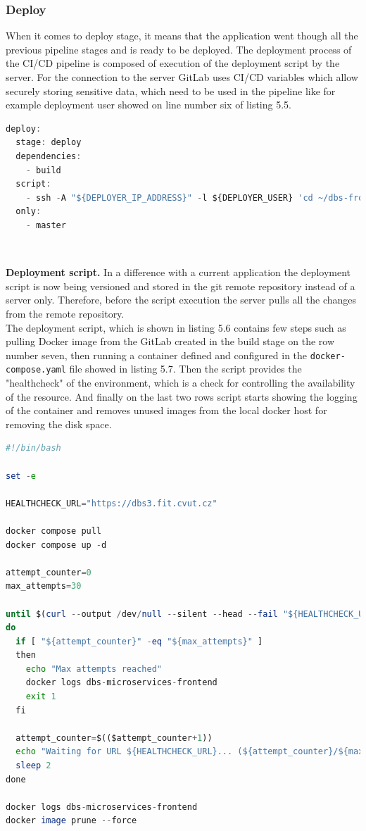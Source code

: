 \subsubsection{Deploy} When it comes to deploy stage, it means that the application went though all the previous pipeline stages and is ready to be deployed. The deployment process of the CI/CD pipeline is composed of execution of the deployment script by the server. For the connection to the server GitLab uses CI/CD variables which allow securely storing sensitive data, which need to be used in the pipeline like for example deployment user showed on line number six of listing 5.5.


\begin{lstlisting}[language=Octave, caption=Deploy stage in the CI/CD pipeline]
deploy:
  stage: deploy
  dependencies:
    - build
  script:
    - ssh -A "${DEPLOYER_IP_ADDRESS}" -l ${DEPLOYER_USER} 'cd ~/dbs-frontend && git pull && cd ./.docker/server && bash deploy-dbs-frontend.sh'
  only:
    - master
\end{lstlisting}

\

\noindent \textbf{Deployment script.} In a difference with a current application the deployment script is now being versioned and stored in the git remote repository instead of a server only. Therefore, before the script execution the server pulls all the changes from the remote repository.\\ The deployment script, which is shown in listing 5.6 contains few steps such as pulling Docker image from the GitLab created in the build stage on the row number seven, then running a container defined and configured in the \texttt{docker-compose.yaml} file showed in listing 5.7. Then the script provides the "healthcheck" of the environment, which is a check for controlling the availability of the resource. And finally on the last two rows script starts showing the logging of the container and removes unused images from the local docker host for removing the disk space.

\begin{lstlisting}[language=Octave, caption=Deployment script]
#!/bin/bash

set -e

HEALTHCHECK_URL="https://dbs3.fit.cvut.cz"

docker compose pull
docker compose up -d

attempt_counter=0
max_attempts=30

until $(curl --output /dev/null --silent --head --fail "${HEALTHCHECK_URL}")
do
  if [ "${attempt_counter}" -eq "${max_attempts}" ]
  then
    echo "Max attempts reached"
    docker logs dbs-microservices-frontend
    exit 1
  fi

  attempt_counter=$(($attempt_counter+1))
  echo "Waiting for URL ${HEALTHCHECK_URL}... (${attempt_counter}/${max_attempts})"
  sleep 2
done

docker logs dbs-microservices-frontend
docker image prune --force
\end{lstlisting}

